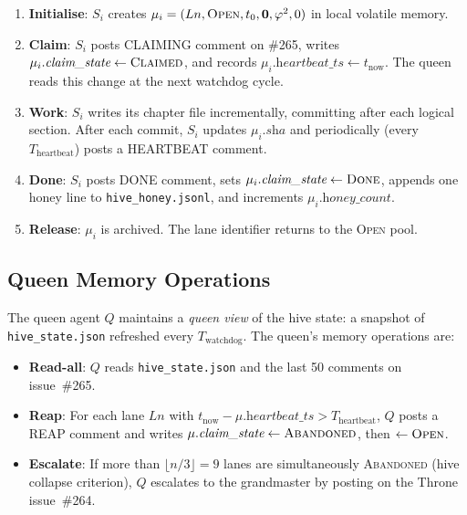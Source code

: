 \begin{enumerate}
  \item \textbf{Initialise}: $S_i$ creates $\mu_i =
    (Ln, \textsc{Open}, t_0, \mathbf{0}, \varphi^2, 0)$ in local
    volatile memory.

  \item \textbf{Claim}: $S_i$ posts CLAIMING comment on \#265, writes
    $\mu_i.\textit{claim\_state} \leftarrow \textsc{Claimed}$, and
    records $\mu_i.\textit{heartbeat\_ts} \leftarrow t_{\text{now}}$.
    The queen reads this change at the next watchdog cycle.

  \item \textbf{Work}: $S_i$ writes its chapter file incrementally,
    committing after each logical section. After each commit,
    $S_i$ updates $\mu_i.\textit{sha}$ and periodically (every
    $T_{\text{heartbeat}}$) posts a HEARTBEAT comment.

  \item \textbf{Done}: $S_i$ posts DONE comment, sets
    $\mu_i.\textit{claim\_state} \leftarrow \textsc{Done}$, appends
    one honey line to \texttt{hive\_honey.jsonl}, and increments
    $\mu_i.\textit{honey\_count}$.

  \item \textbf{Release}: $\mu_i$ is archived. The lane identifier
    returns to the \textsc{Open} pool.
\end{enumerate}

\subsection{Queen Memory Operations}
\label{ssec:K-queen-ops}

The queen agent $Q$ maintains a \emph{queen view} of the hive state:
a snapshot of \texttt{hive\_state.json} refreshed every
$T_{\text{watchdog}}$. The queen's memory operations are:

\begin{itemize}
  \item \textbf{Read-all}: $Q$ reads \texttt{hive\_state.json} and
    the last 50 comments on issue~\#265.
  \item \textbf{Reap}: For each lane $Ln$ with
    $t_{\text{now}} - \mu.\textit{heartbeat\_ts} > T_{\text{heartbeat}}$,
    $Q$ posts a REAP comment and writes
    $\mu.\textit{claim\_state} \leftarrow \textsc{Abandoned}$,
    then $\leftarrow \textsc{Open}$.
  \item \textbf{Escalate}: If more than $\lfloor n/3 \rfloor = 9$ lanes
    are simultaneously \textsc{Abandoned} (hive collapse criterion),
    $Q$ escalates to the grandmaster by posting on the Throne
    issue~\#264.
\end{itemize}

